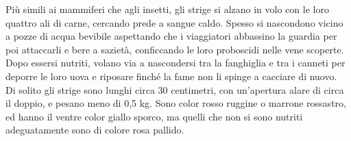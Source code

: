 \begin{multicols}{2}
Più simili ai mammiferi che agli insetti, gli strige si alzano in volo con le loro quattro ali di carne, cercando prede a sangue caldo. Spesso si nascondono vicino a pozze di acqua bevibile aspettando che i viaggiatori abbassino la guardia per poi attaccarli e bere a sazietà, conficcando le loro proboscidi nelle vene scoperte. Dopo essersi nutriti, volano via a nascondersi tra la fanghiglia e tra i canneti per deporre le loro uova e riposare finché la fame non li spinge a cacciare di nuovo.\\

Di solito gli strige sono lunghi circa 30 centimetri, con un'apertura alare di circa il doppio, e pesano meno di 0,5 kg. Sono color rosso ruggine o marrone rossastro, ed hanno il ventre color giallo sporco, ma quelli che non si sono nutriti adeguatamente sono di colore rosa pallido.\\



\end{multicols}
